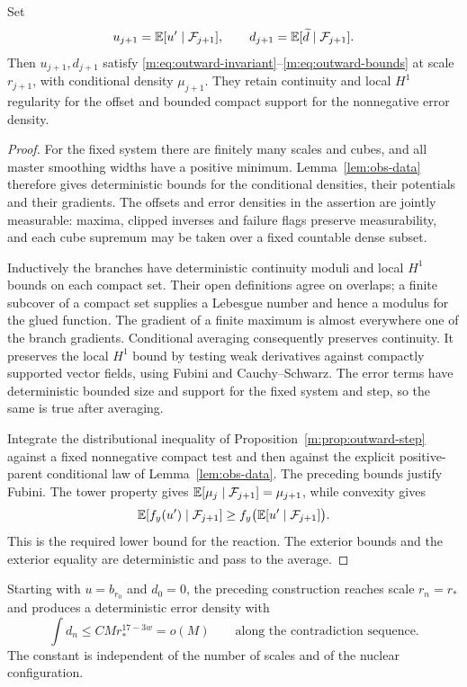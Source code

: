 \begin{lemma}
\label{m:lem:outward-average}
Set
\[
 u_{j+1}=\mathbb E[u'\mid\mathcal F_{j+1}],\qquad
 d_{j+1}=\mathbb E[\widetilde d\mid\mathcal F_{j+1}].
\]
Then $u_{j+1},d_{j+1}$ satisfy
\eqref{m:eq:outward-invariant}--\eqref{m:eq:outward-bounds} at scale $r_{j+1}$,
with conditional density $\mu_{j+1}$.  They retain continuity and local
$H^1$ regularity for the offset and bounded compact support for the
nonnegative error density.
\end{lemma}

\begin{proof}
For the fixed system there are finitely many scales and cubes, and all
master smoothing widths have a positive minimum.
Lemma~\ref{lem:obs-data} therefore gives deterministic bounds for the
conditional densities, their potentials and their gradients.  The offsets
and error densities in the assertion are jointly measurable: maxima,
clipped inverses and failure flags preserve measurability, and each cube
supremum may be taken over a fixed countable dense subset.

Inductively the branches have deterministic continuity moduli and local
$H^1$ bounds on each compact set.  Their open definitions agree on overlaps;
a finite subcover of a compact set supplies a Lebesgue number and hence a
modulus for the glued function.  The gradient of a finite maximum is almost
everywhere one of the branch gradients.  Conditional averaging consequently
preserves continuity.  It preserves the local $H^1$ bound by testing weak
derivatives against compactly supported vector fields, using Fubini and
Cauchy--Schwarz.  The error terms have deterministic bounded size and support
for the fixed system and step, so the same is true after averaging.

Integrate the distributional inequality of
Proposition~\ref{m:prop:outward-step} against a fixed nonnegative compact test
and then against the explicit positive-parent conditional law of
Lemma~\ref{lem:obs-data}.  The preceding bounds justify Fubini.  The tower
property gives
$\mathbb E[\mu_j\mid\mathcal F_{j+1}]=\mu_{j+1}$, while convexity gives
\[
 \mathbb E[f_y(u')\mid\mathcal F_{j+1}]
     \ge f_y\bigl(\mathbb E[u'\mid\mathcal F_{j+1}]\bigr).
\]
This is the required lower bound for the reaction.  The exterior bounds and
the exterior equality are deterministic and pass to the average.
\end{proof}

\begin{lemma}
\label{m:lem:outward-error}
Starting with $u=b_{r_0}$ and $d_0=0$, the preceding construction reaches
scale $r_n=r_*$ and produces a deterministic error density with
\begin{equation}
\label{m:eq:outward-total-error}
 \int d_n\le C M r_*^{17-3w}=o(M)
 \qquad\text{along the contradiction sequence}.
\end{equation}
The constant is independent of the number of scales and of the nuclear
configuration.
\end{lemma}

